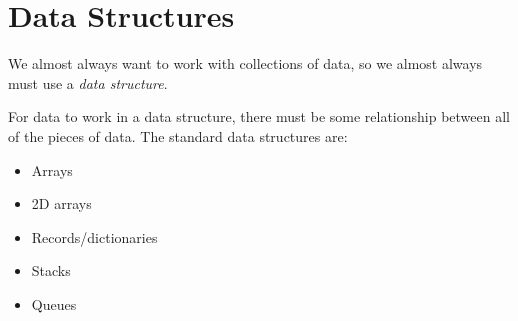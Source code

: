 \section{Data Structures}\label{sec:data_structures}

We almost always want to work with collections of data, so we almost always must use a \emph{data structure}.

For data to work in a data structure, there must be some relationship between all of the pieces of data.
The standard data structures are:
\begin{itemize}
    \item Arrays
    \item 2D arrays
    \item Records/dictionaries
    \item Stacks
    \item Queues
\end{itemize}
